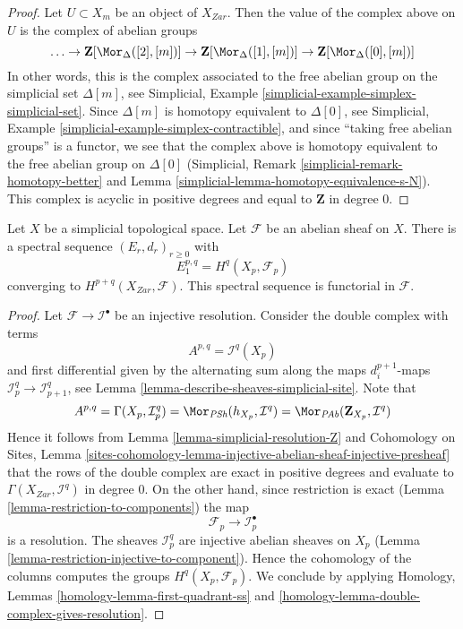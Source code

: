 \begin{proof}
Let $U \subset X_m$ be an object of $X_{Zar}$. Then the value of
the complex above on $U$ is the complex of abelian groups
$$
\ldots \to
\mathbf{Z}[\Mor_\Delta([2], [m])] \to
\mathbf{Z}[\Mor_\Delta([1], [m])] \to
\mathbf{Z}[\Mor_\Delta([0], [m])]
$$
In other words, this is the complex associated to the
free abelian group on the simplicial set $\Delta[m]$, see
Simplicial, Example \ref{simplicial-example-simplex-simplicial-set}.
Since $\Delta[m]$ is homotopy equivalent to $\Delta[0]$, see
Simplicial, Example \ref{simplicial-example-simplex-contractible},
and since ``taking free abelian groups'' is a functor,
we see that the complex above is homotopy equivalent to
the free abelian group on $\Delta[0]$
(Simplicial, Remark \ref{simplicial-remark-homotopy-better} and
Lemma \ref{simplicial-lemma-homotopy-equivalence-s-N}).
This complex is acyclic in positive degrees
and equal to $\mathbf{Z}$ in degree $0$.
\end{proof}

\begin{lemma}
\label{lemma-simplicial-sheaf-cohomology}
Let $X$ be a simplicial topological space. Let $\mathcal{F}$ be an abelian
sheaf on $X$. There is a spectral sequence $(E_r, d_r)_{r \geq 0}$ with
$$
E_1^{p, q} = H^q(X_p, \mathcal{F}_p)
$$
converging to $H^{p + q}(X_{Zar}, \mathcal{F})$.
This spectral sequence is functorial in $\mathcal{F}$.
\end{lemma}

\begin{proof}
Let $\mathcal{F} \to \mathcal{I}^\bullet$ be an injective resolution.
Consider the double complex with terms
$$
A^{p, q} = \mathcal{I}^q(X_p)
$$
and first differential given by the alternating sum along the maps
$d^{p + 1}_i$-maps $\mathcal{I}_p^q \to \mathcal{I}_{p + 1}^q$, see
Lemma \ref{lemma-describe-sheaves-simplicial-site}. Note that
$$
A^{p, q} = \Gamma(X_p, \mathcal{I}_p^q) =
\Mor_{\textit{PSh}}(h_{X_p}, \mathcal{I}^q) =
\Mor_{\textit{PAb}}(\mathbf{Z}_{X_p}, \mathcal{I}^q)
$$
Hence it follows from Lemma \ref{lemma-simplicial-resolution-Z} and
Cohomology on Sites, Lemma
\ref{sites-cohomology-lemma-injective-abelian-sheaf-injective-presheaf}
that the rows of the double complex are exact in positive degrees and
evaluate to $\Gamma(X_{Zar}, \mathcal{I}^q)$ in degree $0$.
On the other hand, since restriction is exact
(Lemma \ref{lemma-restriction-to-components})
the map
$$
\mathcal{F}_p \to \mathcal{I}_p^\bullet
$$
is a resolution. The sheaves $\mathcal{I}_p^q$ are injective
abelian sheaves on $X_p$
(Lemma \ref{lemma-restriction-injective-to-component}).
Hence the cohomology of the columns computes the groups
$H^q(X_p, \mathcal{F}_p)$. We conclude by applying
Homology, Lemmas \ref{homology-lemma-first-quadrant-ss} and
\ref{homology-lemma-double-complex-gives-resolution}.
\end{proof}








